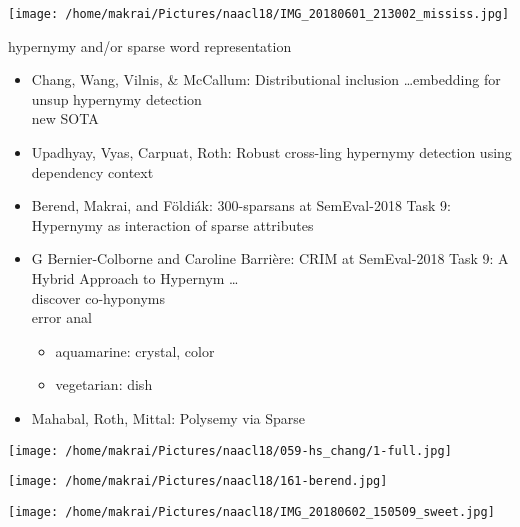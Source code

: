 \documentclass{beamer}
\begin{document}
\begin{frame}
  \texttt{[image: /home/makrai/Pictures/naacl18/IMG\_20180601\_213002\_mississ.jpg]}
\end{frame}

\begin{frame}[allowframebreaks]{hypernymy and/or sparse word representation}
  \begin{itemize}
    \item Chang, Wang, Vilnis, \& McCallum: Distributional inclusion \dots  embedding for
      unsup hypernymy detection
      \\ new SOTA
    \item Upadhyay, Vyas, Carpuat, Roth: Robust cross-ling hypernymy detection using dependency context
    \item Berend, Makrai, and Földiák: 300-sparsans at SemEval-2018 Task 9: \\ Hypernymy as interaction of sparse attributes
    \item G Bernier-Colborne and Caroline Barrière: CRIM at SemEval-2018 Task 9: A
      Hybrid Approach to Hypernym \dots 
      \\ discover co-hyponyms
      \\ error anal
      \begin{itemize}
        \item aquamarine: crystal, color
        \item vegetarian: dish
      \end{itemize}
    \item Mahabal, Roth, Mittal: Polysemy via Sparse
  \end{itemize}
  \texttt{[image: /home/makrai/Pictures/naacl18/059-hs\_chang/1-full.jpg]}

  \texttt{[image: /home/makrai/Pictures/naacl18/161-berend.jpg]}
\end{frame}

\begin{frame}
  \texttt{[image: /home/makrai/Pictures/naacl18/IMG\_20180602\_150509\_sweet.jpg]}
\end{frame}
\end{document}
